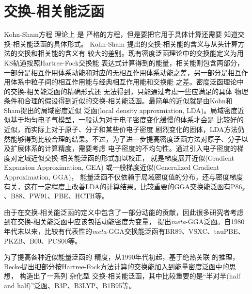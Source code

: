 \section{交换-相关能泛函}
Kohn-Sham方程%
理论上%
是%
严格的方程，但是要把它用于具体计算还需要%
{知道}交换-相关能泛函的具体形式。%
Kohn-Sham%
提出的交换-相关能的含义与从头计算方法的交换和相关能的含义有%
{较}大的差别{。现有}密度泛函理论中的交换能定义为用KS轨道按照Hartree-Fock交换能%
{表达}式计算得到的能量，相关能则包含两部分，一部分是相互作用体系动能和对应的无相互作用体系动能{之}差，另一部分是相互作用体系中粒子间的相互作用能与经典相互作用{能}和交换能%
{之}差。密度泛函{理论}中的交换-相关能泛函的精确形式还%
{无法}得到，只能通过{考虑}一些{应满足的}具体%
物理%
{条件}和合理的假设得到近似的交换-相关能泛函。最简单的近似就是由Kohn和Sham提出的局域密度近似%
{泛函}\cite{PRA140-1133_1965}(local density approxmiation, LDA){。}局域密度近似基于均匀电子气模型，一般认为对于电子密度变化缓慢的体系{才会}是%
比较好的近似，而实际上对于原子、分子和某些价电子密度%
剧烈变化的固体，LDA方法仍然能够得到比较合理的结果。不过，为了进一步提高密度泛函方法对原子、分子以及扩展体系的计算精度，需要考虑%
电子密度的不均匀性。通过引入电子密度的梯度对{定域近似}交换-相关能{泛函}的形式加以校正，%
{就是}梯度展开近似(Gradient Expansion Approximation, GEA)%
{或}一般梯度近似(Generalized Gradient Approximation, GGA)，%
能量泛函不仅依赖于局域密度值的分布，还与密度梯度有关，这在一定程度上改善LDA的计算结果。比较重要的GGA交换能泛函有P86$_x$\cite{PRB33-8800_1986}、B88\cite{PRA38-3098_1988}、PW91\cite{PRB46-6671_1992,PRB48-4978_1993,PRB54-16533_1996,PRB57-14999_1998}、PBE\cite{PRL77-1396_1996,IBID78-1396_1997}、HCTH\cite{JCP109-6264_1998}等。

由于在交换-相关能泛函的定义中包含了一部分动能的贡献，因此很多研究者考虑{到}在交换-相关{能}泛函中应该包括动能密度为变量，%
{提出}\textit{meta}-GGA泛函。自1980年代末以来，比较有代表性的\textit{meta}-GGA交换能泛函有BR89\cite{PRA39-3761_1989}、\linebreak VSXC\cite{JCP109-400_1998}、tauPBE\cite{JCP111-911_1999}、PKZB\cite{PRL82-2544_1999,PRL82-5179_1999}、B00\cite{JCP112-4020_2000}、PCS00\cite{JCP113-10013_2000}等。

为了提高各种近似{能量}泛函的%
精度，从1990年代初起，基于绝热关联%
{的推理}，Becke提出把部分按Hartree-Fock方法计算的交换能加入到能量密度泛函中的思想{，}%
构造出了一系列%
杂化型%
交换-相关{能}泛函，其中比较重要的是“半对半(half and half)”泛函\cite{JCP98-1372_1993}、B3P\cite{JCP98-5648_1993}、B3LYP\cite{JPC98-11623_1994}、B1B95\cite{JCP104-1040_1995}等。

